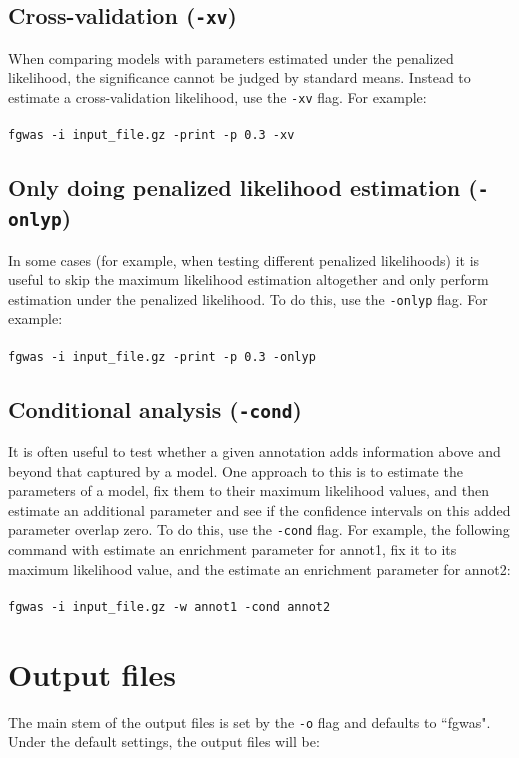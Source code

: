 \documentclass[11pt,titlepage]{article}
\begin{document}
\subsection{Cross-validation (\texttt{-xv})}
When comparing models with parameters estimated under the penalized likelihood, the significance cannot be judged by standard means. Instead to estimate a cross-validation likelihood, use the \texttt{-xv} flag. For example:
\\
\\
\texttt{fgwas -i input\_file.gz -print -p 0.3 -xv}
\subsection{Only doing penalized likelihood estimation (\texttt{-onlyp})}
In some cases (for example, when testing different penalized likelihoods) it is useful to skip the maximum likelihood estimation altogether and only perform estimation under the penalized likelihood. To do this, use the \texttt{-onlyp} flag. For example:
\\
\\
\texttt{fgwas -i input\_file.gz -print -p 0.3 -onlyp}

\subsection{Conditional analysis (\texttt{-cond})}
It is often useful to test whether a given annotation adds information above and beyond that captured by a model. One approach to this is to estimate the parameters of a model, fix them to their maximum likelihood values, and then estimate an additional parameter and see if the confidence intervals on this added parameter overlap zero. To do this, use the \texttt{-cond} flag. For example, the following command with estimate an enrichment parameter for annot1, fix it to its maximum likelihood value, and the estimate an enrichment parameter for annot2:
\\
\\
\texttt{fgwas -i input\_file.gz -w annot1 -cond annot2}



\section{Output files}
The main stem of the output files is set by the \texttt{-o} flag and defaults to ``fgwas". Under the default settings, the output files will be:
\end{document}
